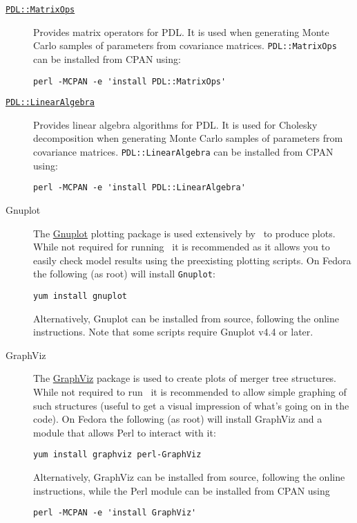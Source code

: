 \begin{description}
  \item [\href{http://search.cpan.org/~chm/PDL-2.4.7/Basic/MatrixOps/matrixops.pd}{{\tt PDL::MatrixOps}}] Provides matrix operators for PDL. It is used when generating Monte Carlo samples of parameters from covariance matrices. {\tt PDL::MatrixOps} can be installed from CPAN using:
\begin{verbatim}
perl -MCPAN -e 'install PDL::MatrixOps'
\end{verbatim}
  \item [\href{http://search.cpan.org/~ellipse/PDL-LinearAlgebra-0.06/LinearAlgebra.pm}{{\tt PDL::LinearAlgebra}}] Provides linear algebra algorithms for PDL. It is used for Cholesky decomposition when generating Monte Carlo samples of parameters from covariance matrices. {\tt PDL::LinearAlgebra} can be installed from CPAN using:
\begin{verbatim}
perl -MCPAN -e 'install PDL::LinearAlgebra'
\end{verbatim}

\item[Gnuplot] The \href{http://www.gnuplot.info/}{\sc Gnuplot} plotting package is used extensively by \glc\ to produce plots. While not required for running \glc\ it is recommended as it allows you to easily check model results using the preexisting plotting scripts. On Fedora the following (as root) will install {\tt Gnuplot}:
\begin{verbatim}
yum install gnuplot
\end{verbatim}
Alternatively, {\sc Gnuplot} can be installed from source, following the online instructions. Note that some scripts require {\sc Gnuplot} v4.4 or later.

\item[GraphViz] The \href{http://www.graphviz.org/}{GraphViz} package is used to create plots of merger tree structures. While not required to run \glc\ it is recommended to allow simple graphing of such structures (useful to get a visual impression of what's going on in the code). On Fedora the following (as root) will install GraphViz and a module that allows Perl to interact with it:
\begin{verbatim}
yum install graphviz perl-GraphViz
\end{verbatim}
Alternatively, GraphViz can be installed from source, following the online instructions, while the Perl module can be installed from CPAN using
\begin{verbatim}
perl -MCPAN -e 'install GraphViz'
\end{verbatim}

\end{description}

